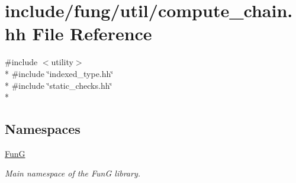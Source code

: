 \hypertarget{compute__chain_8hh}{}\section{include/fung/util/compute\+\_\+chain.hh File Reference}
\label{compute__chain_8hh}
{\ttfamily \#include $<$utility$>$}\\*
{\ttfamily \#include \char`\"{}indexed\+\_\+type.\+hh\char`\"{}}\\*
{\ttfamily \#include \char`\"{}static\+\_\+checks.\+hh\char`\"{}}\\*
\subsection*{Namespaces}
\begin{DoxyCompactItemize}
\item 
 \hyperlink{namespaceFunG}{FunG}
\begin{DoxyCompactList}\small\item\em Main namespace of the FunG library. \end{DoxyCompactList}\end{DoxyCompactItemize}
